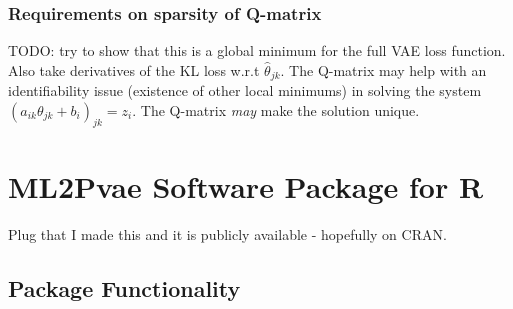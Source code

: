 \subsubsection{Requirements on sparsity of Q-matrix}

TODO: try to show that this is a global minimum for the full VAE loss function. Also take derivatives of the KL loss w.r.t $\hat \theta_{jk}$. The Q-matrix may help with an identifiability issue (existence of other local minimums) in solving the system $(a_{ik}\theta_{jk} + b_i)_{jk} = z_i$. The Q-matrix \textit{may} make the solution unique.


\section{ML2Pvae Software Package for R}
Plug that I made this and it is publicly available - hopefully on CRAN.

\subsection{Package Functionality}

